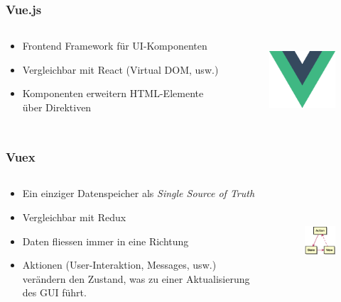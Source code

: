 \begin{frame}
    \frametitle{Vue.js}
    \begin{columns}
        \begin{column}{0.68\textwidth}
            \begin{itemize}
                \item Frontend Framework für UI-Komponenten
                \item Vergleichbar mit React (Virtual DOM, usw.)
                \item Komponenten erweitern HTML-Elemente über Direktiven
            \end{itemize}
        \end{column}
        \begin{column}{0.28\textwidth}
            \begin{figure}
                \centering
                \includegraphics[height=3cm]{media/Vue-JS-01.eps}
            \end{figure}
        \end{column}
    \end{columns}
\end{frame}

\begin{frame}
    \frametitle{Vuex}
    \begin{columns}
        \begin{column}{0.58\textwidth}
            \begin{itemize}
                \item Ein einziger Datenspeicher als \textit{Single Source of Truth}
                \item Vergleichbar mit Redux
                \item Daten fliessen immer in eine Richtung
                \item Aktionen (User-Interaktion, Messages, usw.) verändern den Zustand, was zu einer Aktualisierung des GUI führt.
            \end{itemize}
        \end{column}
        \begin{column}{0.38\textwidth}
            \begin{figure}
                \centering
                \includegraphics[height=4cm]{media/Vuex.eps}
            \end{figure}
        \end{column}
    \end{columns}
\end{frame}
